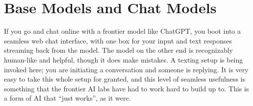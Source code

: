 \section{Base Models and Chat Models}



If you go and chat online with a frontier model like ChatGPT, you boot into a
seamless web chat interface, with one box for your input and text responses
streaming back from the model. The model on the other end is recognizably
human-like and helpful, though it does make mistakes. A texting setup is being
invoked here; you are initiating a conversation and someone is replying. It is
very easy to take this whole setup for granted, and this level of seamless
usefulness is something that the frontier AI labs have had to work hard to
build up to. This is a form of AI that ``just works'', as it were.


